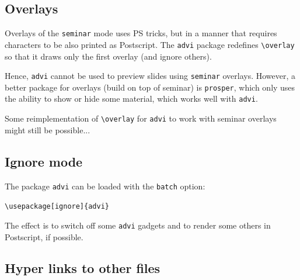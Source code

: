 \documentclass[12pt]{article}
\begin{document}
\newpage

\subsection* {Overlays}
\hypertarget {overlays}{}

Overlays of the \verb"seminar" mode uses PS tricks, but in a manner that
requires characters to be also printed as Postscript. The \verb"advi" package 
redefines \verb"\overlay" so that it draws only the first overlay (and
ignore others).

Hence, \verb"advi" cannot be used to preview slides using \verb"seminar"
overlays. However, a better package for overlays (build on top of seminar)
is \verb"prosper", which only uses the ability to show or hide some
material, which works well with \verb"advi".

Some reimplementation of \verb"\overlay" for \verb"advi" to work with 
seminar overlays might still be possible...  

\subsection* {Ignore mode}

The package \verb"advi" can be loaded with the \verb"batch" option:

\smallskip
{\verb"\usepackage[ignore]{advi}"}
\smallskip

The effect is to switch off some \verb"advi" gadgets and to render some others 
in Postscript, if possible. 

\newpage

\subsection* {Hyper links to other files}
\end{document}
